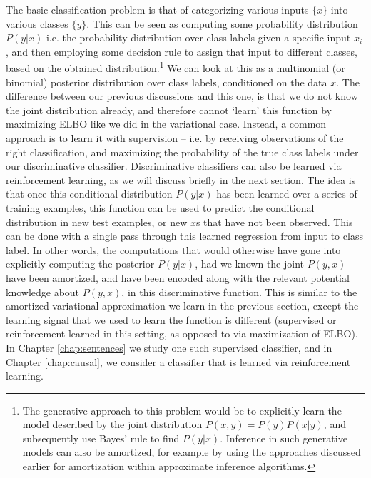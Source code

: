 The basic classification problem is that of categorizing various inputs $\{x\}$ into various classes $\{y\}$. This can be seen as computing some probability distribution $P(y | x)$ i.e. the probability distribution over class labels given a specific input $x_i$, and then employing some decision rule to assign that input to different classes, based on the obtained distribution.\footnote{The generative approach to this problem would be to explicitly learn the model described by the joint distribution $P(x, y) = P(y) P(x | y)$, and subsequently use Bayes' rule to find $P(y | x)$.  Inference in such generative models can also be amortized, for example by using the approaches discussed earlier for amortization within approximate inference algorithms.} We can look at this as a multinomial (or binomial) posterior distribution over class labels, conditioned on the data $x$. The difference between our previous discussions and this one, is that we do not know the joint distribution already, and therefore cannot `learn' this function by maximizing ELBO like we did in the variational case. Instead, a common approach is to learn it with supervision -- i.e. by receiving observations of the right classification, and maximizing the probability of the true class labels under our discriminative classifier. Discriminative classifiers can also be learned via reinforcement learning, as we will discuss briefly in the next section. The idea is that once this conditional distribution $P(y | x)$ has been learned over a series of training examples, this function can be used to predict the conditional distribution in new test examples, or new $x$s that have not been observed. This can be done with a single pass through this learned regression from input to class label. In other words, the computations that would otherwise have gone into explicitly computing the posterior $P(y | x)$, had we known the joint $P(y,x)$ have been amortized, and have been encoded along with the relevant potential knowledge about $P(y,x)$, in this discriminative function. This is similar to the amortized variational approximation we learn in the previous section, except the learning signal that we used to learn the function is different (supervised or reinforcement learned in this setting, as opposed to via maximization of ELBO). In Chapter \ref{chap:sentences} we study one such supervised classifier, and in Chapter \ref{chap:causal}, we consider a classifier that is learned via reinforcement learning.

